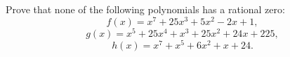 Prove that none of the following polynomials has a rational zero:
\[
f(x)=x^7+25x^3+5x^2-2x+1,
\]
\[
g(x)=x^5+25x^4+x^3+25x^2+24x+225,
\]
\[
h(x)=x^7+x^5+6x^2+x+24.
\]
